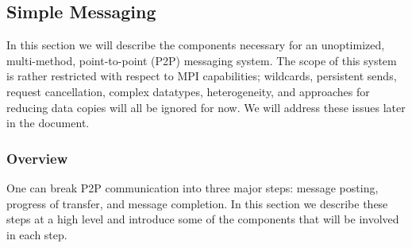 


\subsection{Simple Messaging}

% 

In this section we will describe the components necessary for an unoptimized,
multi-method, point-to-point (P2P) messaging system.  The scope of this system
is rather restricted with respect to MPI capabilities; wildcards, persistent
sends, request cancellation, complex datatypes, heterogeneity, and approaches
for reducing data copies will all be ignored for now.  We will address these
issues later in the document.

\subsubsection{Overview}

% 
% 
% 

One can break P2P communication into three major steps: message
posting, progress of transfer, and message completion.  In this section we
describe these steps at a high level and introduce some of the components that
will be involved in each step.

% 


